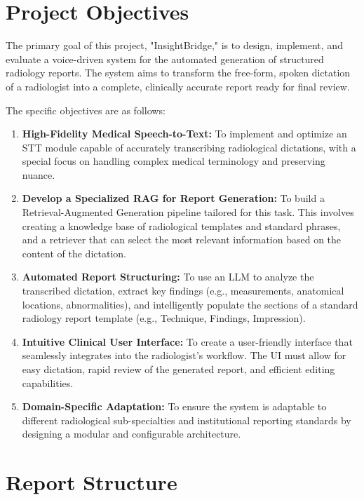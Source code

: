 \section{Project Objectives}

The primary goal of this project, "InsightBridge," is to design, implement, and evaluate a voice-driven system for the automated generation of structured radiology reports. The system aims to transform the free-form, spoken dictation of a radiologist into a complete, clinically accurate report ready for final review.

The specific objectives are as follows:
\begin{enumerate}
    \item \textbf{High-Fidelity Medical Speech-to-Text:} To implement and optimize an STT module capable of accurately transcribing radiological dictations, with a special focus on handling complex medical terminology and preserving nuance.
    \item \textbf{Develop a Specialized RAG for Report Generation:} To build a Retrieval-Augmented Generation pipeline tailored for this task. This involves creating a knowledge base of radiological templates and standard phrases, and a retriever that can select the most relevant information based on the content of the dictation.
    \item \textbf{Automated Report Structuring:} To use an LLM to analyze the transcribed dictation, extract key findings (e.g., measurements, anatomical locations, abnormalities), and intelligently populate the sections of a standard radiology report template (e.g., Technique, Findings, Impression).
    \item \textbf{Intuitive Clinical User Interface:} To create a user-friendly interface that seamlessly integrates into the radiologist's workflow. The UI must allow for easy dictation, rapid review of the generated report, and efficient editing capabilities.
    \item \textbf{Domain-Specific Adaptation:} To ensure the system is adaptable to different radiological sub-specialties and institutional reporting standards by designing a modular and configurable architecture.
\end{enumerate}

\section{Report Structure}

